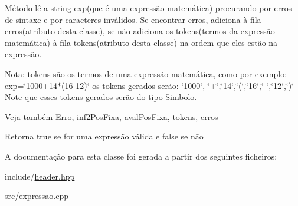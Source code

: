 Método lê a string exp(que é uma expressão matemática) procurando por erros de sintaxe e por caracteres inválidos. Se encontrar erros, adiciona à fila erros(atributo desta classe), se não adiciona os tokens(termos da expressão matemática) à fila tokens(atributo desta classe) na ordem que eles estão na expressão.

Nota\-: tokens são os termos de uma expressão matemática, como por exemplo\-: exp=\char`\"{}1000+14$\ast$(16-\/12)\char`\"{} os tokens gerados serão\-: \char`\"{}1000\char`\"{}, \char`\"{}+\char`\"{},\char`\"{}14\char`\"{},\char`\"{}(\char`\"{},\char`\"{}16\char`\"{},\char`\"{}-\/\char`\"{},\char`\"{}12\char`\"{},\char`\"{})\char`\"{} Note que esses tokens gerados serão do tipo \hyperlink{class_simbolo}{Simbolo}. \begin{DoxySeeAlso}{Veja também}
\hyperlink{class_erro}{Erro}, inf2\-Pos\-Fixa, \hyperlink{class_expressao_a129eb361b81c38d02ee248a921677ddf}{aval\-Pos\-Fixa}, \hyperlink{class_expressao_ae8528431a58ed3a8029737fdb3b732a4}{tokens}, \hyperlink{class_expressao_a0bb6edb491bbe0a21b25057839e3daa0}{erros} 
\end{DoxySeeAlso}
\begin{DoxyReturn}{Retorna}
true se for uma expressão válida e false se não 
\end{DoxyReturn}


A documentação para esta classe foi gerada a partir dos seguintes ficheiros\-:\begin{DoxyCompactItemize}
\item 
include/\hyperlink{header_8hpp}{header.\-hpp}\item 
src/\hyperlink{expressao_8cpp}{expressao.\-cpp}\end{DoxyCompactItemize}
